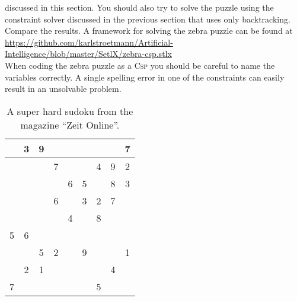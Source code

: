 discussed in this section.  You should also try to solve the puzzle using the constraint solver discussed in
the previous section that uses only backtracking.  Compare the results.  A framework for solving the zebra
puzzle can be found at 
\\[0.2cm]
\hspace*{1.3cm}
\href{https://github.com/karlstroetmann/Artificial-Intelligence/blob/master/SetlX/zebra-csp.stlx}{https://github.com/karlstroetmann/Artificial-Intelligence/blob/master/SetlX/zebra-csp.stlx}
\\[0.2cm]
When coding the zebra puzzle as a \textsc{Csp} you should be careful to name the variables correctly.  A single
spelling error in one of the constraints can easily result in an unsolvable problem.
\eoxs

\begin{table}[h]
  \centering
  \begin{tabular}{||c|c|c||c|c|c||c|c|c||}
    \hline
    \hline
      & 3 & 9 &   &   &   &   &   & 7 \\
    \hline
      &   &   & 7 &   &   & 4 & 9 & 2 \\
    \hline
      &   &   &   & 6 & 5 &   & 8 & 3 \\
    \hline
    \hline
      &   &   & 6 &   & 3 & 2 & 7 &   \\
    \hline
      &   &   &   & 4 &   & 8 &   &   \\
    \hline
    5 & 6 &   &   &   &   &   &   &   \\
    \hline
    \hline
      &   & 5 & 2 &   & 9 &   &   & 1 \\
    \hline
      & 2 & 1 &   &   &   &   & 4 &   \\
    \hline
    7 &   &   &   &   &   & 5 &   &   \\
    \hline
    \hline
  \end{tabular}
  \caption{A super hard sudoku from the magazine ``Zeit Online''.}
  \label{tab:sudoku}
\end{table}

